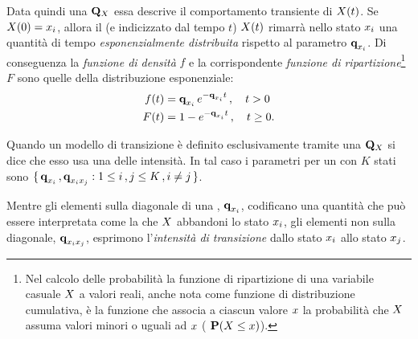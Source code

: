 Data quindi una \im*{} $\mathbf{Q}_{\mathnormal{X}}$ essa descrive il comportamento transiente di $\mathnormal{X}(t)$. Se $\mathnormal{X}(0)=\mathnormal{x}_i$, allora il \mprocess*{} \omog*{} (e indicizzato dal tempo $t$) $\mathnormal{X}(t)$ rimarrà nello stato $\mathnormal{x}_i$ una quantità di tempo \emph{esponenzialmente distribuita} rispetto al parametro $\boldsymbol{\textbf{\text{q}}}_{\mathnormal{x}_i}$. Di conseguenza la \emph{funzione di densità} $f$ e la corrispondente \emph{funzione di ripartizione}\footnote{Nel calcolo delle probabilità la funzione di ripartizione di una variabile casuale $\mathnormal{X}$ a valori reali, anche nota come funzione di distribuzione cumulativa, è la funzione che associa a ciascun valore $\mathnormal{x}$ la probabilità che $\mathnormal{X}$ assuma valori minori o uguali ad $\mathnormal{x}$ (\ie{} $\mathbf{P}(\mathnormal{X} \le \mathnormal{x})$).} $F$ sono quelle della distribuzione esponenziale:
\begin{equation}
\label{eq:im-distrib}
\begin{split}
f(t) &= \boldsymbol{\textbf{\text{q}}}_{\mathnormal{x}_i}\,e^{-\boldsymbol{\textbf{\text{q}}}_{\mathnormal{x}_i}t}\,,\quad t>0 \\
F(t) &= 1-e^{-\boldsymbol{\textbf{\text{q}}}_{\mathnormal{x}_i}t}\,,\quad t\geq0\text{.}
\end{split}
\end{equation}

Quando un modello di transizione è definito esclusivamente tramite una \im*{} $\mathbf{Q}_{\mathnormal{X}}$ si dice che esso usa una \emph{} delle intensità. In tal caso i parametri per un \mprocess*{} \omog*{} con $K$ stati sono $\{\,\boldsymbol{\textbf{\text{q}}}_{\mathnormal{x}_i}\,,\boldsymbol{\textbf{\text{q}}}_{\mathnormal{x}_i\mathnormal{x}_j} : 1 \leq i\,,j \leq K\,,i \neq j\,\}$.

Mentre gli elementi sulla diagonale di una \im*{}, $\boldsymbol{\textbf{\text{q}}}_{\mathnormal{x}_i}$, codificano una quantità che può essere interpretata come la \emph{} che $\mathnormal{X}$ abbandoni lo stato $\mathnormal{x}_i$, gli elementi non sulla diagonale, $\boldsymbol{\textbf{\text{q}}}_{\mathnormal{x}_i\mathnormal{x}_j}$, esprimono l'\emph{intensità di transizione} dallo stato $\mathnormal{x}_i$ allo stato $\mathnormal{x}_j$.


